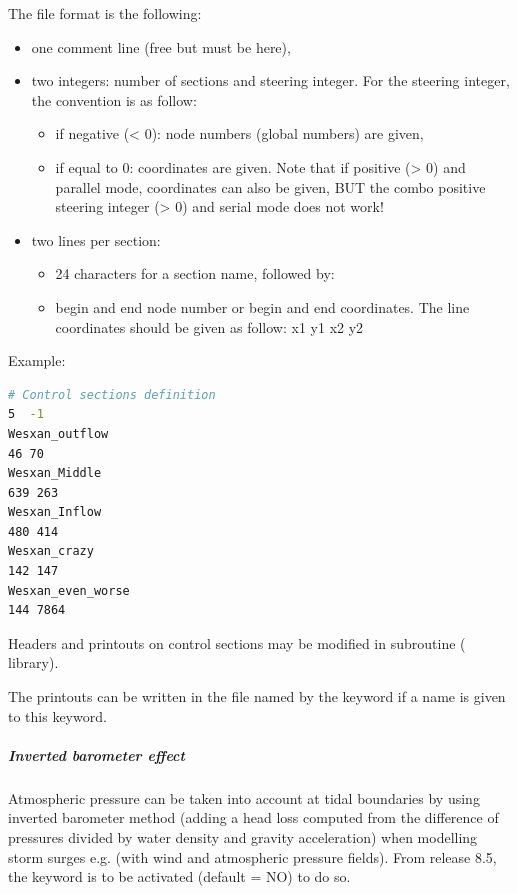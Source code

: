 The file format is the following:

\begin{itemize}
\item one comment line (free but must be here),

\item two integers: number of sections and steering integer.
For the steering integer, the convention is as follow:
  \begin{itemize}
  \item if negative (< 0): node numbers (global numbers) are given,
  \item if equal to 0: coordinates are given.
Note that if positive (> 0) and parallel mode, coordinates can also be given,
BUT the combo positive steering integer (> 0) and serial mode does not work!
  \end{itemize}

\item two lines per section:

\begin{itemize}

\item 24 characters for a section name, followed by:

\item begin and end node number or begin and end coordinates.
The line coordinates should be given as follow: x1 y1 x2 y2

\end{itemize}
\end{itemize}

Example:
\begin{lstlisting}[language=bash]
# Control sections definition
5  -1
Wesxan_outflow
46 70
Wesxan_Middle
639 263
Wesxan_Inflow
480 414
Wesxan_crazy
142 147
Wesxan_even_worse
144 7864
\end{lstlisting}

Headers and printouts on control sections may be modified in
 subroutine ( library).

The printouts can be written in the file named by the keyword
 if a name is given to this keyword.

\subparagraph{Inverted barometer effect}

Atmospheric pressure can be taken into account at tidal boundaries by using
inverted barometer method (adding a head loss computed from the difference of
pressures divided by water density and gravity acceleration)
when modelling storm surges e.g. (with wind and atmospheric pressure fields).
From release 8.5, the keyword 
is to be activated (default = NO) to do so.
